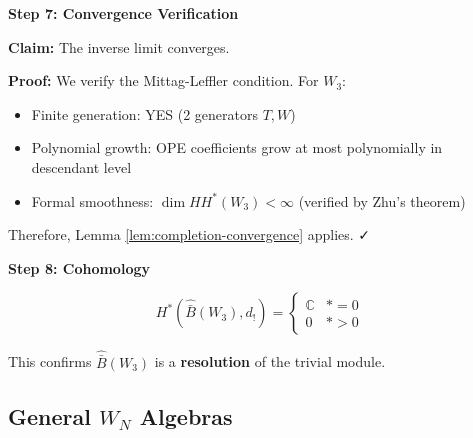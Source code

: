 \begin{example}
\medskip
\noindent\textbf{Step 7: Convergence Verification}

\textbf{Claim:} The inverse limit converges.

\textbf{Proof:} We verify the Mittag-Leffler condition. For $W_3$:
\begin{itemize}
\item Finite generation: YES (2 generators $T, W$)
\item Polynomial growth: OPE coefficients grow at most polynomially in descendant level
\item Formal smoothness: $\dim HH^*(W_3) < \infty$ (verified by Zhu's theorem)
\end{itemize}

Therefore, Lemma \ref{lem:completion-convergence} applies. ✓

\medskip
\noindent\textbf{Step 8: Cohomology}

$$H^*(\widehat{\bar{B}}(W_3), d_!) = \begin{cases}
\mathbb{C} & * = 0 \\
0 & * > 0
\end{cases}$$

This confirms $\widehat{\bar{B}}(W_3)$ is a \textbf{resolution} of the trivial module.
\end{example}


\subsection{General $W_N$ Algebras}

